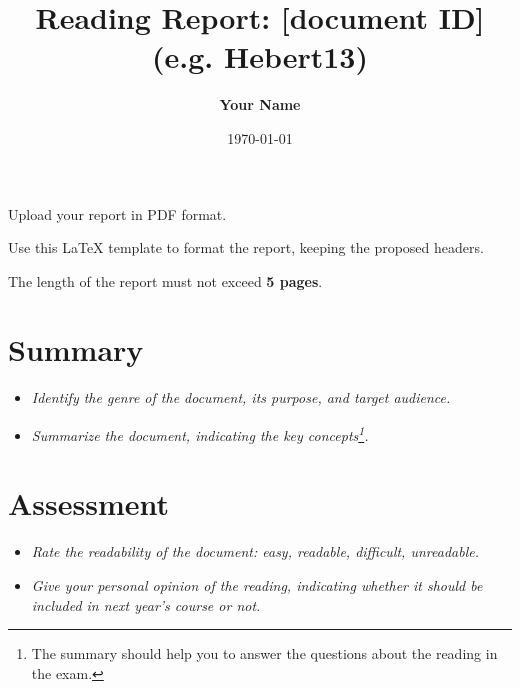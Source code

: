 \documentclass[a4paper, 10pt]{article}
\title{Reading Report: [document ID] (e.g. Hebert13)}
\author{\textbf{Your Name}}
\date{\normalsize\today{}}
\begin{document}
\maketitle

\begin{center}
  Upload your report in PDF format.
  
  Use this LaTeX template to format the report, keeping the proposed headers.
  
	The length of the report must not exceed \textbf{5 pages}.
\end{center}

\section{Summary}

\begin{itemize}
	\item \textit{Identify the genre of the document, its purpose, and target audience.}
  \item \textit{Summarize the document, indicating the key concepts\footnote{The summary should help you to answer the questions about the reading in the exam.}.}
\end{itemize}

\section{Assessment}

\begin{itemize}
	\item \textit{Rate the readability of the document: easy, readable, difficult, unreadable.}
  \item \textit{Give your personal opinion of the reading, indicating whether it should be included in next year's course or not.}
\end{itemize}
\end{document}
